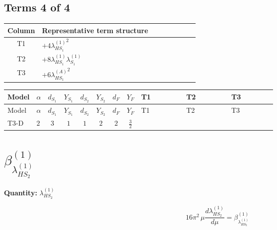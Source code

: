 \documentclass[8pt]{article}
\begin{document}
\begin{landscape}
\subsection*{Terms 4 of 4}
\begin{center}
\begin{tabular}{@{}c >{\raggedright\arraybackslash}p{0.82\linewidth}@{}}
\toprule
Column & Representative term structure \\
\midrule
T1 & \(\displaystyle +4 {\lambda_{HS_1}^{(1)}}^2\) \\
\midrule
T2 & \(\displaystyle +8 {\lambda_{HS_1}^{(1)}} {\lambda_{S_1}^{(1)}}\) \\
\midrule
T3 & \(\displaystyle +6 {\lambda_{HS_1}^{(A)}}^2\) \\
\midrule
\bottomrule
\end{tabular}
\end{center}
\smallskip
\tiny
\begin{longtable}{@{}llcccccc >{\raggedright\arraybackslash}p{0.21\linewidth} >{\raggedright\arraybackslash}p{0.21\linewidth} >{\raggedright\arraybackslash}p{0.21\linewidth}@{}}
\toprule
Model & $\alpha$ & $d_{S_1}$ & $Y_{S_1}$ & $d_{S_2}$ & $Y_{S_2}$ & $d_F$ & $Y_F$ & T1 & T2 & T3 \\
\midrule
\endfirsthead
\toprule
Model & $\alpha$ & $d_{S_1}$ & $Y_{S_1}$ & $d_{S_2}$ & $Y_{S_2}$ & $d_F$ & $Y_F$ & T1 & T2 & T3 \\
\midrule
\endhead
T3-D & $2$ & $3$ & $1$ & $1$ & $2$ & $2$ & $\frac{3}{2}$ & \scriptsize\adjustbox{max width=\linewidth}{$\begin{gathered} +4 {\lambda_{HS_1}^{(1)}}^2\end{gathered}$} & \scriptsize\adjustbox{max width=\linewidth}{$\begin{gathered} +8 {\lambda_{HS_1}^{(1)}} {\lambda_{S_1}^{(1)}}\end{gathered}$} & \scriptsize\adjustbox{max width=\linewidth}{$\begin{gathered} +6 {\lambda_{HS_1}^{(A)}}^2\end{gathered}$} \\
\midrule
\bottomrule
\end{longtable}
\clearpage
\section*{$\beta_{\lambda_{HS_2}^{(1)}}^{(1)}$}
\noindent\textbf{Quantity: }$\lambda_{HS_2}^{(1)}$\par\smallskip
\[16\pi^2\,\mu\frac{d \lambda_{HS_2}^{(1)}}{d\mu}=\beta_{\lambda_{HS_2}^{(1)}}^{(1)}\]

\end{landscape}
\end{document}
